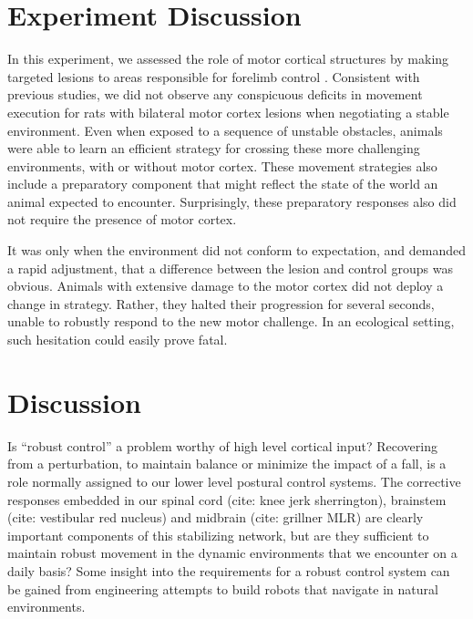 \section{Experiment Discussion}

In this experiment, we assessed the role of motor cortical structures by making targeted lesions to areas responsible for forelimb control \cite{Kawai2015,Otchy2015}. Consistent with previous studies, we did not observe any conspicuous deficits in movement execution for rats with bilateral motor cortex lesions when negotiating a stable environment. Even when exposed to a sequence of unstable obstacles, animals were able to learn an efficient strategy for crossing these more challenging environments, with or without motor cortex. These movement strategies also include a preparatory component that might reflect the state of the world an animal expected to encounter. Surprisingly, these preparatory responses also did not require the presence of motor cortex.

It was only when the environment did not conform to expectation, and demanded a rapid adjustment, that a difference between the lesion and control groups was obvious. Animals with extensive damage to the motor cortex did not deploy a change in strategy. Rather, they halted their progression for several seconds, unable to robustly respond to the new motor challenge. In an ecological setting, such hesitation could easily prove fatal.

\section{Discussion}

Is ``robust control'' a problem worthy of high level cortical input? Recovering from a perturbation, to maintain balance or minimize the impact of a fall, is a role normally assigned to our lower level postural control systems. The corrective responses embedded in our spinal cord (cite: knee jerk sherrington), brainstem (cite: vestibular red nucleus) and midbrain (cite: grillner MLR) are clearly important components of this stabilizing network, but are they sufficient to maintain robust movement in the dynamic environments that we encounter on a daily basis? Some insight into the requirements for a robust control system can be gained from engineering attempts to build robots that navigate in natural environments.

